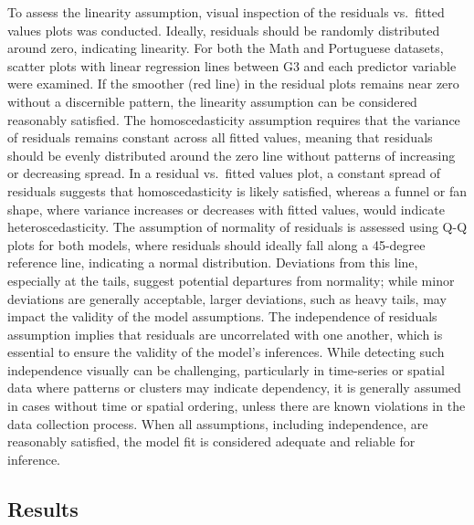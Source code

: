 \documentclass[letterpaper,9pt,twocolumn,twoside,]{pinp}
\begin{document}
To assess the linearity assumption, visual inspection of the residuals
vs.~fitted values plots was conducted. Ideally, residuals should be
randomly distributed around zero, indicating linearity. For both the
Math and Portuguese datasets, scatter plots with linear regression lines
between G3 and each predictor variable were examined. If the smoother
(red line) in the residual plots remains near zero without a discernible
pattern, the linearity assumption can be considered reasonably
satisfied. The homoscedasticity assumption requires that the variance of
residuals remains constant across all fitted values, meaning that
residuals should be evenly distributed around the zero line without
patterns of increasing or decreasing spread. In a residual vs.~fitted
values plot, a constant spread of residuals suggests that
homoscedasticity is likely satisfied, whereas a funnel or fan shape,
where variance increases or decreases with fitted values, would indicate
heteroscedasticity. The assumption of normality of residuals is assessed
using Q-Q plots for both models, where residuals should ideally fall
along a 45-degree reference line, indicating a normal distribution.
Deviations from this line, especially at the tails, suggest potential
departures from normality; while minor deviations are generally
acceptable, larger deviations, such as heavy tails, may impact the
validity of the model assumptions. The independence of residuals
assumption implies that residuals are uncorrelated with one another,
which is essential to ensure the validity of the model's inferences.
While detecting such independence visually can be challenging,
particularly in time-series or spatial data where patterns or clusters
may indicate dependency, it is generally assumed in cases without time
or spatial ordering, unless there are known violations in the data
collection process. When all assumptions, including independence, are
reasonably satisfied, the model fit is considered adequate and reliable
for inference.

\subsection{Results}\label{results}
\end{document}
